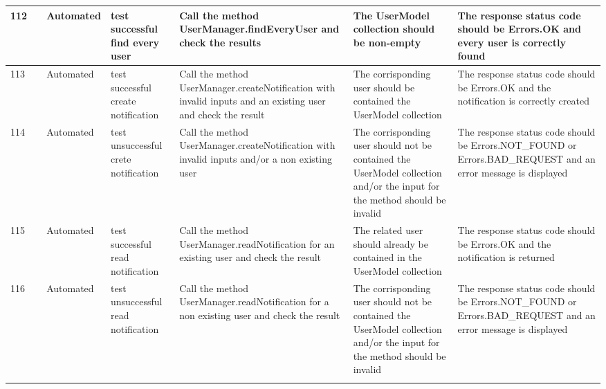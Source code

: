 \documentclass{article}
\begin{document}
{\begin{tabular}{|
    >{\columncolor[HTML]{FFFFFF}}l |
    >{\columncolor[HTML]{FFFFFF}}c |
    >{\columncolor[HTML]{FFFFFF}}l |l|l|l|l|}
    112                                 & \cellcolor[HTML]{FFFFFF}                                                     & {\color[HTML]{11734B} Automated} & test successful find every user             & Call the method UserManager.findEveryUser and check the results                                                             & The UserModel collection should be non-empty                                                                                 & The response status code should be Errors.OK and every user is correctly found                                \\ \cline{1-1} \cline{3-7} 
    113                                 & \cellcolor[HTML]{FFFFFF}                                                     & {\color[HTML]{11734B} Automated} & test successful create notification         & Call the method UserManager.createNotification with invalid inputs and an existing user and check the result                & The corrisponding user should be contained the UserModel collection                                                          & The response status code should be Errors.OK and the notification is correctly created                        \\ \cline{1-1} \cline{3-7} 
    114                                 & \cellcolor[HTML]{FFFFFF}                                                     & {\color[HTML]{11734B} Automated} & test unsuccessful crete notification        & Call the method UserManager.createNotification with invalid inputs and/or a non existing user                               & The corrisponding user should not be contained the UserModel collection and/or the input for the method should be invalid    & The response status code should be Errors.NOT\_FOUND or Errors.BAD\_REQUEST and an error message is displayed \\ \cline{1-1} \cline{3-7} 
    115                                 & \cellcolor[HTML]{FFFFFF}                                                     & {\color[HTML]{11734B} Automated} & test successful read notification           & Call the method UserManager.readNotification for an existing user and check the result                                      & The related user should already be contained in the UserModel collection                                                     & The response status code should be Errors.OK and the notification is returned                                 \\ \cline{1-1} \cline{3-7} 
    116                                 & \cellcolor[HTML]{FFFFFF}                                                     & {\color[HTML]{11734B} Automated} & test unsuccessful read notification         & Call the method UserManager.readNotification for a non existing user and check the result                                   & The corrisponding user should not be contained the UserModel collection and/or the input for the method should be invalid    & The response status code should be Errors.NOT\_FOUND or Errors.BAD\_REQUEST and an error message is displayed \\ \cline{1-1} \cline{3-7} 

\end{tabular}}
\end{document}
